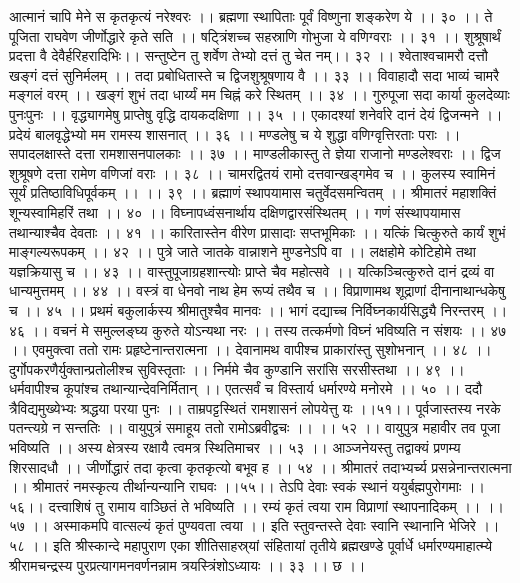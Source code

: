 आत्मानं चापि मेने स कृतकृत्यं नरेश्वरः ।।
ब्रह्मणा स्थापिताः पूर्वं विष्णुना शङ्करेण ये ।। ३० ।।
ते पूजिता राघवेण जीर्णोद्धारे कृते सति ।।
षट्त्रिंशच्च सहस्राणि गोभुजा ये वणिग्वराः ।। ३१ ।।
शुश्रूषार्थं प्रदत्ता वै देवैर्हरिहरादिभिः।।
सन्तुष्टेन तु शर्वेण तेभ्यो दत्तं तु चेत नम्।। ३२ ।।
श्वेताश्वचामरौ दत्तौ खङ्गं दत्तं सुनिर्मलम् ।।
तदा प्रबोधितास्ते च द्विजशुश्रूषणाय वै ।। ३३ ।।
विवाहादौ सदा भाव्यं चामरै मङ्गलं वरम् ।।
खङ्गं शुभं तदा धार्य्यं मम चिह्नं करे स्थितम् ।। ३४ ।।
गुरुपूजा सदा कार्या कुलदेव्याः पुनःपुनः ।।
वृद्ध्यागमेषु प्राप्तेषु वृद्धि दायकदक्षिणा ।। ३५ ।।
एकादश्यां शनेर्वारे दानं देयं द्विजन्मने ।।
प्रदेयं बालवृद्धेभ्यो मम रामस्य शासनात् ।। ३६ ।।
मण्डलेषु च ये शुद्धा वणिग्वृत्तिरताः पराः ।।
सपादलक्षास्ते दत्ता रामशासनपालकाः ।। ३७ ।।
माण्डलीकास्तु ते ज्ञेया राजानो मण्डलेश्वराः ।।
द्विज शुश्रूषणे दत्ता रामेण वणिजां वराः ।। ३८ ।।
चामरद्वितयं रामो दत्तवान्खड्गमेव च ।।
कुलस्य स्वामिनं सूर्यं प्रतिष्ठाविधिपूर्वकम् ।। ।। ३९ ।।
ब्रह्माणं स्थापयामास चतुर्वेदसमन्वितम् ।।
श्रीमातरं महाशक्तिं शून्यस्वामिहरिं तथा ।। ४० ।।
विघ्नापध्वंसनार्थाय दक्षिणद्वारसंस्थितम् ।।
गणं संस्थापयामास तथान्याश्चैव देवताः ।। ४१ ।।
कारितास्तेन वीरेण प्रासादाः सप्तभूमिकाः ।।
यत्किं चित्कुरुते कार्यं शुभं माङ्गल्यरूपकम् ।। ४२ ।।
पुत्रे जाते जातके वान्नाशने मुण्डनेऽपि वा ।।
लक्षहोमे कोटिहोमे तथा यज्ञक्रियासु च ।। ४३ ।।
वास्तुपूजाग्रहशान्त्योः प्राप्ते चैव महोत्सवे ।।
यत्किञ्चित्कुरुते दानं द्रव्यं वा धान्यमुत्तमम् ।। ४४ ।।
वस्त्रं वा धेनवो नाथ हेम रूप्यं तथैव च ।।
विप्राणामथ शूद्राणां दीनानाथान्धकेषु च ।। ४५ ।।
प्रथमं बकुलार्कस्य श्रीमातुश्चैव मानवः ।।
भागं दद्याच्च निर्विघ्नकार्यसिद्ध्यै निरन्तरम् ।। ४६ ।।
वचनं मे समुल्लङ्घ्य कुरुते योऽन्यथा नरः ।।
तस्य तत्कर्मणो विघ्नं भविष्यति न संशयः ।। ४७ ।।
एवमुक्त्वा ततो रामः प्रहृष्टेनान्तरात्मना ।।
देवानामथ वापीश्च प्राकारांस्तु सुशोभनान् ।। ४८ ।।
दुर्गोपकरणैर्युक्तान्प्रतोलीश्च सुविस्तृताः ।।
निर्ममे चैव कुण्डानि सरांसि सरसीस्तथा ।। ४९ ।।
धर्मवापीश्च कूपांश्च तथान्यान्देवनिर्मितान् ।।
एतत्सर्वं च विस्तार्य धर्मारण्ये मनोरमे ।। ५० ।।
ददौ त्रैविद्यमुख्येभ्यः श्रद्धया परया पुनः ।।
ताम्रपट्टस्थितं रामशासनं लोपयेत्तु यः ।।५१।।
पूर्वजास्तस्य नरके पतन्त्यग्रे न सन्ततिः ।।
वायुपुत्रं समाहूय ततो रामोऽब्रवीद्वचः ।। ।। ५२ ।।
वायुपुत्र महावीर तव पूजा भविष्यति ।।
अस्य क्षेत्रस्य रक्षायै त्वमत्र स्थितिमाचर ।। ५३ ।।
आञ्जनेयस्तु तद्वाक्यं प्रणम्य शिरसादधौ ।।
जीर्णोद्धारं तदा कृत्वा कृतकृत्यो बभूव ह ।। ५४ ।।
श्रीमातरं तदाभ्यर्च्य प्रसन्नेनान्तरात्मना ।।
श्रीमातरं नमस्कृत्य तीर्थान्यन्यानि राघवः ।।५५।।
तेऽपि देवाः स्वकं स्थानं ययुर्बह्मपुरोगमाः ।।५६।।
दत्त्वाशिषं तु रामाय वाञ्छितं ते भविष्यति ।।
रम्यं कृतं त्वया राम विप्राणां स्थापनादिकम् ।। ।। ५७ ।।
अस्माकमपि वात्सल्यं कृतं पुण्यवता त्वया ।।
इति स्तुवन्तस्ते देवाः स्वानि स्थानानि भेजिरे ।। ५८ ।।
इति श्रीस्कान्दे महापुराण एका शीतिसाहस्र्यां संहितायां तृतीये ब्रह्मखण्डे पूर्वार्धे धर्मारण्यमाहात्म्ये श्रीरामचन्द्रस्य पुरप्रत्यागमनवर्णनन्नाम त्रयस्त्रिंशोऽध्यायः ।। ३३ ।। छ ।।


